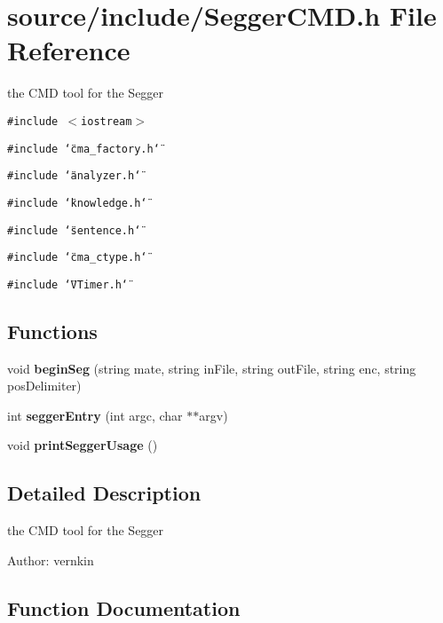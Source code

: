 \section{source/include/SeggerCMD.h File Reference}
\label{SeggerCMD_8h}
the CMD tool for the Segger  


{\tt \#include $<$iostream$>$}\par
{\tt \#include \char`\"{}cma\_\-factory.h\char`\"{}}\par
{\tt \#include \char`\"{}analyzer.h\char`\"{}}\par
{\tt \#include \char`\"{}knowledge.h\char`\"{}}\par
{\tt \#include \char`\"{}sentence.h\char`\"{}}\par
{\tt \#include \char`\"{}cma\_\-ctype.h\char`\"{}}\par
{\tt \#include \char`\"{}VTimer.h\char`\"{}}\par
\subsection*{Functions}
\begin{CompactItemize}
\item 
void {\bf beginSeg} (string mate, string inFile, string outFile, string enc, string posDelimiter)
\item 
int \textbf{seggerEntry} (int argc, char $\ast$$\ast$argv)\label{SeggerCMD_8h_e624a37c8cde5a86c57acff2b8e2b15a}

\item 
void \textbf{printSeggerUsage} ()\label{SeggerCMD_8h_7c87e8750f51eca3e1b15b7f252d5131}

\end{CompactItemize}


\subsection{Detailed Description}
the CMD tool for the Segger 

\begin{Desc}
\item[Author:]vernkin \end{Desc}


\subsection{Function Documentation}
